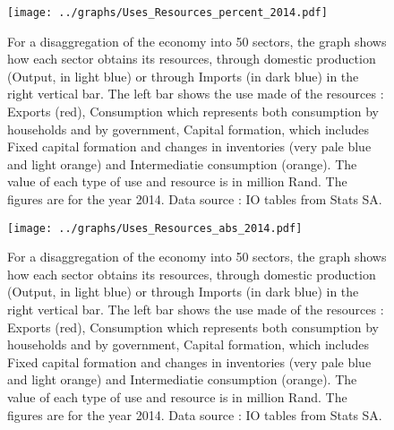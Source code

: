 \documentclass[12pt,english]{article}
\begin{document}
\begin{landscape}
	\thispagestyle{empty}
	\begin{figure}[!ht]
		\vspace{-30pt}\hspace{-36pt}\texttt{[image: ../graphs/Uses\_Resources\_percent\_2014.pdf]}
		\caption{\label{Uses_Resources_percent_2014}For a disaggregation of the economy into 50 sectors, the graph shows how each sector obtains its resources, through domestic production (Output, in light blue) or through Imports (in dark blue) in the right vertical bar. The left bar shows the use made of the resources : Exports (red), Consumption which represents both consumption by households and by government, Capital formation, which includes Fixed capital formation and changes in inventories (very pale blue and light orange) and Intermediatie consumption (orange). The value of each type of use and resource is in million Rand. The figures are for the year 2014. Data source : IO tables from Stats SA.}
	\end{figure}	
\end{landscape}


\begin{landscape}
	\thispagestyle{empty}
	\begin{figure}[!ht]
		\vspace{-30pt}\hspace{-36pt}\texttt{[image: ../graphs/Uses\_Resources\_abs\_2014.pdf]}
		\caption{\label{Uses_Resources_abs_2014}For a disaggregation of the economy into 50 sectors, the graph shows how each sector obtains its resources, through domestic production (Output, in light blue) or through Imports (in dark blue) in the right vertical bar. The left bar shows the use made of the resources : Exports (red), Consumption which represents both consumption by households and by government, Capital formation, which includes Fixed capital formation and changes in inventories (very pale blue and light orange) and Intermediatie consumption (orange). The value of each type of use and resource is in million Rand. The figures are for the year 2014. Data source : IO tables from Stats SA.}
	\end{figure}	
\end{landscape}

\end{document}
